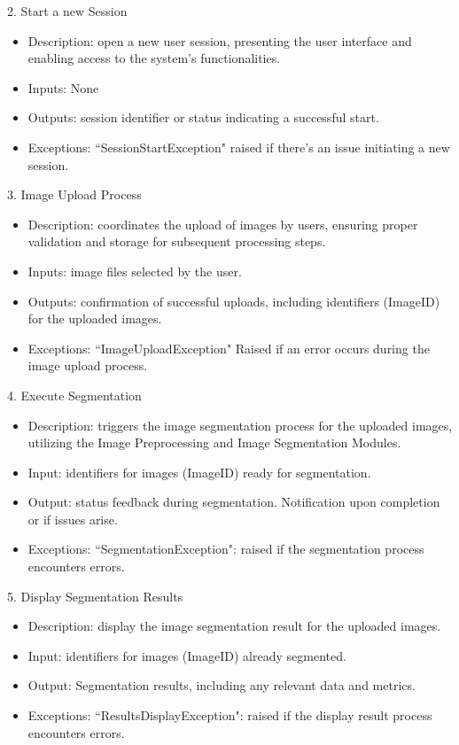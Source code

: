 \documentclass[12pt, titlepage]{article}
\begin{document}
2. Start a new Session
\begin{itemize}
    \item Description: open a new user session, presenting the user interface and enabling access to the system's functionalities.
    \item Inputs: None
    \item Outputs: session identifier or status indicating a successful start.
    \item Exceptions: ``SessionStartException" raised if there's an issue initiating a new session.
\end{itemize}



3. Image Upload Process
\begin{itemize}
    \item Description: coordinates the upload of images by users, ensuring proper validation and storage for subsequent processing steps.
    \item Inputs: image files selected by the user.
    \item Outputs: confirmation of successful uploads, including identifiers (ImageID) for the uploaded images.
    \item Exceptions: ``ImageUploadException" Raised if an error occurs during the image upload process.
\end{itemize}

4. Execute Segmentation
\begin{itemize}
    \item Description: triggers the image segmentation process for the uploaded images, utilizing the Image Preprocessing and Image Segmentation Modules.
    \item Input: identifiers for images (ImageID) ready for segmentation.
    \item Output: status feedback during segmentation. Notification upon completion or if issues arise.
    \item Exceptions: ``SegmentationException": raised if the segmentation process encounters errors.
\end{itemize} 

5. Display Segmentation Results
\begin{itemize}
    \item Description: display the image segmentation result for the uploaded images.
    \item Input: identifiers for images (ImageID) already segmented.
    \item Output: Segmentation results, including any relevant data and metrics.
    \item Exceptions: ``ResultsDisplayException": raised if the display result process encounters errors.
\end{itemize} 
\end{document}
